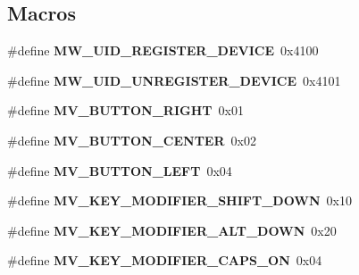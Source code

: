 \subsection*{Macros}
\begin{DoxyCompactItemize}
\item 
\mbox{\label{group__libmisc__fb__mw_ga789e020aeb7b86b62f9159ae2d866659}} 
\#define {\bfseries M\+W\+\_\+\+U\+I\+D\+\_\+\+R\+E\+G\+I\+S\+T\+E\+R\+\_\+\+D\+E\+V\+I\+CE}~0x4100
\item 
\mbox{\label{group__libmisc__fb__mw_ga53e945d07cf917ce629d22bab1dd6175}} 
\#define {\bfseries M\+W\+\_\+\+U\+I\+D\+\_\+\+U\+N\+R\+E\+G\+I\+S\+T\+E\+R\+\_\+\+D\+E\+V\+I\+CE}~0x4101
\item 
\mbox{\label{group__libmisc__fb__mw_ga1f34592569cd1dbf1c5269b9215c0704}} 
\#define {\bfseries M\+V\+\_\+\+B\+U\+T\+T\+O\+N\+\_\+\+R\+I\+G\+HT}~0x01
\item 
\mbox{\label{group__libmisc__fb__mw_gac1907cc30514805e4e0daccbd31f4640}} 
\#define {\bfseries M\+V\+\_\+\+B\+U\+T\+T\+O\+N\+\_\+\+C\+E\+N\+T\+ER}~0x02
\item 
\mbox{\label{group__libmisc__fb__mw_ga440b0c34d82ff8b81a8493e27b1f4ac9}} 
\#define {\bfseries M\+V\+\_\+\+B\+U\+T\+T\+O\+N\+\_\+\+L\+E\+FT}~0x04
\item 
\mbox{\label{group__libmisc__fb__mw_ga78bafd68059f1771dc164ef596f2a23b}} 
\#define {\bfseries M\+V\+\_\+\+K\+E\+Y\+\_\+\+M\+O\+D\+I\+F\+I\+E\+R\+\_\+\+S\+H\+I\+F\+T\+\_\+\+D\+O\+WN}~0x10
\item 
\mbox{\label{group__libmisc__fb__mw_ga7b6f156f9ddeec3aeec2990c8dbf872b}} 
\#define {\bfseries M\+V\+\_\+\+K\+E\+Y\+\_\+\+M\+O\+D\+I\+F\+I\+E\+R\+\_\+\+A\+L\+T\+\_\+\+D\+O\+WN}~0x20
\item 
\mbox{\label{group__libmisc__fb__mw_gafe6b21850a19bb1e8b93af2d2c4f3d5e}} 
\#define {\bfseries M\+V\+\_\+\+K\+E\+Y\+\_\+\+M\+O\+D\+I\+F\+I\+E\+R\+\_\+\+C\+A\+P\+S\+\_\+\+ON}~0x04
\item 
\mbox{\label{group__libmisc__fb__mw_ga1486ff4904fb40b0ac9e6656de352f16}} 

\end{DoxyCompactItemize}
